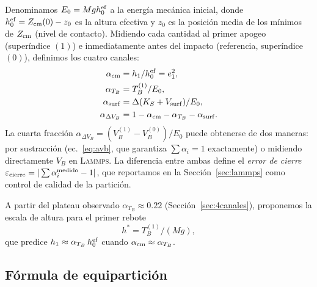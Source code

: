 \documentclass[12pt,a4paper]{article}
\newcommand{\lammps}{\textsc{Lammps}}
\begin{document}
Denominamos $E_0 = Mg h_0^{\rm ef}$ a la energía mecánica inicial, donde
$h_0^{\rm ef}=Z_{\rm cm}(0)-z_0$ es la altura efectiva y $z_0$ es la posición
media de los mínimos de $Z_{\rm cm}$ (nivel de contacto). Midiendo cada
cantidad al primer apogeo (superíndice $(1)$) e inmediatamente antes del
impacto (referencia, superíndice $(0)$), definimos los cuatro canales:
\begin{align}
    \alpha_{\rm cm}         &= h_1/h_0^{\rm ef} = e_1^2, \label{eq:acm}\\
    \alpha_{T_B}            &= T_B^{(1)}/E_0,   \label{eq:atb}\\
    \alpha_{\rm surf}       &= \Delta(K_S + V_{\rm surf})/E_0, \label{eq:asurf}\\
    \alpha_{\Delta V_B}     &= 1-\alpha_{\rm cm}-\alpha_{T_B}-\alpha_{\rm surf}.
    \label{eq:avb}
\end{align}
La cuarta fracción $\alpha_{\Delta V_B}=(V_B^{(1)}-V_B^{(0)})/E_0$ puede
obtenerse de dos maneras: por sustracción (ec.~\eqref{eq:avb}, que garantiza
$\sum\alpha_i=1$ exactamente) o midiendo directamente $V_B$ en \lammps{}.
La diferencia entre ambas define el \emph{error de cierre}
$\varepsilon_{\rm cierre}=|\sum\alpha_i^{\rm medido}-1|$, que reportamos en
la Sección~\ref{sec:lammps} como control de calidad de la partición.

A partir del plateau observado $\alpha_{T_B}\approx0.22$ (Sección~\ref{sec:4canales}),
proponemos la escala de altura para el primer rebote
\begin{equation}
    h^* = T_B^{(1)}/(Mg),
    \label{eq:hstar}
\end{equation}
que predice $h_1\approx\alpha_{T_B}\,h_0^{\rm ef}$ cuando
$\alpha_{\rm cm}\approx\alpha_{T_B}$.

\subsection{Fórmula de equipartición}
\label{sec:equiparticion}
\end{document}
